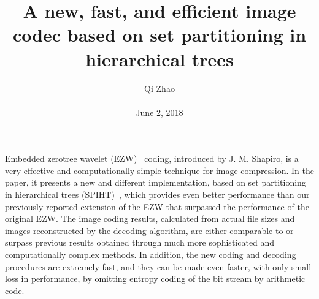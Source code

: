 \documentclass[10pt,twocolumn,letterpaper]{article}
\begin{document}
\title{A new, fast, and efficient image codec based on set partitioning in hierarchical trees}
\author{Qi Zhao\\\\June 2, 2018}

\maketitle
\par Embedded zerotree wavelet (EZW)~\cite{creusere1997new} coding, introduced by J. M. Shapiro, is a very effective and computationally simple technique for image compression. In the paper, it presents a new and different implementation, based on set partitioning in hierarchical trees (SPIHT)~\cite{kim2000low}, which provides even better performance than our previously reported extension of the EZW that surpassed the performance of the original EZW. The image coding results, calculated from actual file sizes and images reconstructed by the decoding algorithm, are either comparable to or surpass previous results obtained through much more sophisticated and computationally complex methods. In addition, the new coding and decoding procedures are extremely fast, and they can be made even faster, with only small loss in performance, by omitting entropy coding of the bit stream by arithmetic code.
\end{document}
